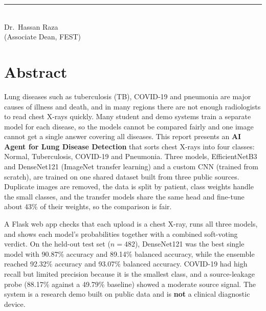 \begin{titlepage}
\begin{titlepagetext}
    \vspace{1.2cm}

    \begin{minipage}[t]{0.45\textwidth}
        \centering
        \rule{5.5cm}{0.4pt}\\[0.4em]
        Dr.~Hassan Raza\\[0.2em]
        (Associate Dean, FEST)
    \end{minipage}
    \end{titlepagetext}
\end{titlepage}

\hypersetup{pageanchor=true}

\frontmatter
{}
\pagestyle{frontmatter}

\chapter*{Abstract}

Lung diseases such as tuberculosis (TB), COVID-19 and pneumonia are major causes of illness and death, and in many regions there are not enough radiologists to read chest X-rays quickly. Many student and demo systems train a separate model for each disease, so the models cannot be compared fairly and one image cannot get a single answer covering all diseases. This report presents an \textbf{AI Agent for Lung Disease Detection} that sorts chest X-rays into four classes: Normal, Tuberculosis, COVID-19 and Pneumonia. Three models, EfficientNetB3 and DenseNet121 (ImageNet transfer learning) and a custom CNN (trained from scratch), are trained on one shared dataset built from three public sources. Duplicate images are removed, the data is split by patient, class weights handle the small classes, and the transfer models share the same head and fine-tune about 43\% of their weights, so the comparison is fair.

A Flask web app checks that each upload is a chest X-ray, runs all three models, and shows each model's probabilities together with a combined soft-voting verdict. On the held-out test set ($n=482$), DenseNet121 was the best single model with 90.87\% accuracy and 89.14\% balanced accuracy, while the ensemble reached 92.32\% accuracy and 93.07\% balanced accuracy. COVID-19 had high recall but limited precision because it is the smallest class, and a source-leakage probe (88.17\% against a 49.79\% baseline) showed a moderate source signal. The system is a research demo built on public data and is \textbf{not} a clinical diagnostic device.

